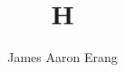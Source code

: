 \documentclass{beamer}
\title{H}
\author{James Aaron Erang\orcidlink{0000-0002-1959-3796}}
\date{}
\begin{document}
    \begin{frame}
        \titlepage
    \end{frame}
\end{document}
